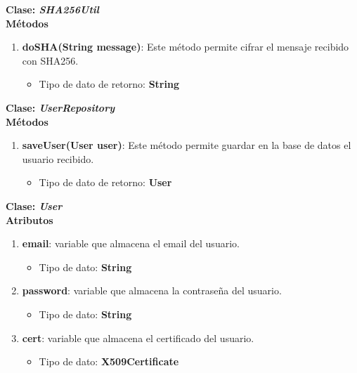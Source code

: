 \documentclass[12pt, a4paper, titlepage]{report}
\begin{document}
    		    
    		    \textbf{\textcolor{guindapoli}{Clase: \textit{SHA256Util}}}\\
                   
		            \textbf{Métodos}
    		        \begin{enumerate}
    		            \item \textbf{doSHA(String message)}: Este método permite cifrar el mensaje recibido con SHA256.
    		            \begin{itemize}
    		                \item Tipo de dato de retorno: \textbf{String}
    		            \end{itemize}
    		        \end{enumerate}
    		        
    		        
    		    \textbf{\textcolor{guindapoli}{Clase: \textit{UserRepository}}}\\
                   
		            \textbf{Métodos}
    		        \begin{enumerate}
    		            \item \textbf{saveUser(User user)}: Este método permite guardar en la base de datos el usuario recibido.
    		            \begin{itemize}
    		                \item Tipo de dato de retorno: \textbf{User}
    		            \end{itemize}
    		        \end{enumerate}
    		        
    		    
    		    \textbf{\textcolor{guindapoli}{Clase: \textit{User}}}\\
                   
		            \textbf{Atributos}
    		        \begin{enumerate}
    		             \item \textbf{email}: variable que almacena el email del usuario.
    		            \begin{itemize}
    		                \item Tipo de dato: \textbf{String}
    		            \end{itemize}
    		             \item \textbf{password}: variable que almacena la contraseña del usuario.
    		            \begin{itemize}
    		                \item Tipo de dato: \textbf{String}
    		            \end{itemize}
    		             \item \textbf{cert}: variable que almacena el certificado del usuario.
    		            \begin{itemize}
    		                \item Tipo de dato: \textbf{X509Certificate}
    		            \end{itemize}
    		        \end{enumerate}
    		    
\end{document}
